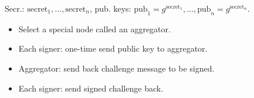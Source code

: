 \begin{frame}
Secr.: $\mathrm{secret}_1, \dots, \mathrm{secret}_n$, pub. keys: $\mathrm{pub}_1 = g^{ \mathrm{secret }_1 }, \dots, \mathrm{pub}_n= g^{\mathrm{secret}_n}$.
\begin{emptyTheorem}
\begin{itemize}
\item Select a special node called an aggregator.
\item Each signer: one-time send public key to aggregator.
\item Aggregator: send back challenge message to be signed.
\item Each signer: send signed challenge back.
\end{itemize}
\end{emptyTheorem}

\vskip 15cm

\end{frame}

